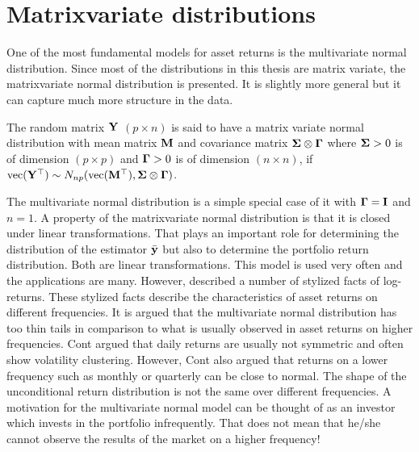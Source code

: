 \documentclass[12pt, oneside]{book}\usepackage{knitr}
\begin{document}
{\section{Matrixvariate distributions}
One of the most fundamental models for asset returns is the multivariate normal distribution. 
Since most of the distributions in this thesis are matrix variate, the matrixvariate normal distribution is presented. 
It is slightly more general but it can capture much more structure in the data.
\begin{definition}\label{def:matrixnormal}
	The random matrix $\mathbf{Y}$ $(p \times n)$ is said to have a matrix variate normal distribution with mean matrix $\mathbf{M}$ and covariance matrix $\mathbf{\Sigma} \otimes \boldsymbol{\Gamma}$ where $\mathbf{\Sigma} > 0$ is of dimension $(p \times p)$ and $\boldsymbol{\Gamma} >0$ is of dimension $(n \times n)$, if $\operatorname{vec}(\mathbf{Y}^\top) \sim N_{np}(\operatorname{vec}(\mathbf{M}^\top), \mathbf{\Sigma} \otimes \boldsymbol{\Gamma})$.
\end{definition}
The multivariate normal distribution is a simple special case of it with $\boldsymbol{\Gamma} = \mathbf{I}$ and $n=1$.
A property of the matrixvariate normal distribution is that it is closed under linear transformations.
That plays an important role for determining the distribution of the estimator $\bar{\mathbf{y}}$ but also to determine the portfolio return distribution.
Both are linear transformations.
This model is used very often and the applications are many.
However, \citet{cont2001empirical} described a number of stylized facts of log-returns. 
These stylized facts describe the characteristics of asset returns on different frequencies.  
It is argued that the multivariate normal distribution has too thin tails in comparison to what is usually observed in asset returns on higher frequencies.
Cont argued that daily returns are usually not symmetric and often show volatility clustering.
However, Cont also argued that returns on a lower frequency such as monthly or quarterly can be close to normal.
The shape of the unconditional return distribution is not the same over different frequencies. 
A motivation for the multivariate normal model can be thought of as an investor which invests in the portfolio infrequently.
That does not mean that he/she cannot observe the results of the market on a higher frequency!

}
\end{document}
